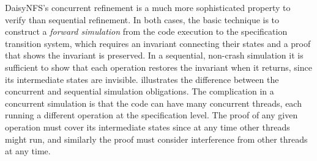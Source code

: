 DaisyNFS's concurrent refinement is a much more sophisticated property to verify
than sequential refinement. In both cases, the basic technique is to construct a
\emph{forward simulation} from the code execution to the specification
transition system, which requires an invariant connecting their states and a
proof that shows the invariant is preserved. In a sequential, non-crash
simulation it is sufficient to show that each operation restores the invariant
when it returns, since its intermediate states are invisible.
 illustrates the difference between the
concurrent and sequential simulation obligations. The complication in a concurrent simulation is that the code can have many concurrent
threads, each running a different operation at the specification level. The
proof of any given operation must cover its intermediate states since at any
time other threads might run, and similarly the proof must consider interference
from other threads at any time.

